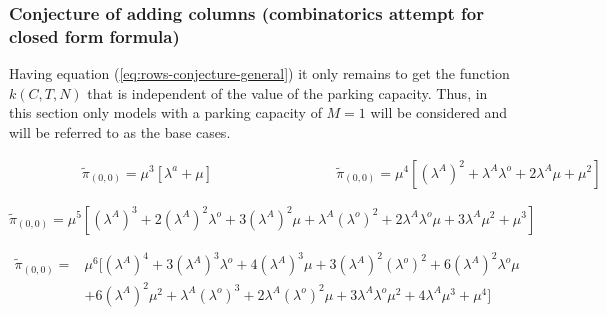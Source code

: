 \subsubsection{Conjecture of adding columns (combinatorics attempt for closed form formula)}
Having equation (\ref{eq:rows-conjecture-general}) it only remains to get the function \(k(C,T,N)\) that is independent of the value of the parking capacity. 
Thus, in this section only models with a parking capacity of \(M=1\) will be considered and will be referred to as the base cases. 

\begin{multicols}{2}
    \begin{figure}[H]
        \centering
        \scalebox{0.9}{}
    \end{figure}
    \columnbreak
    \begin{figure}[H]
        \centering
        \scalebox{0.9}{}
    \end{figure}
\end{multicols}
\vspace{-0.5cm}
\begin{alignat}{2} \label{eq:00_rate_1131}
    \hspace{4em} & \tilde{\pi}_{(0,0)} = \mu^3[\lambda^a + \mu] \hspace{8em} & \tilde{\pi}_{(0,0)} = \mu^4[(\lambda^A)^2 + \lambda^A \lambda^o + 2\lambda^A \mu + \mu^2] 
\end{alignat}


\begin{figure}[h]
    \centering
    \scalebox{0.8}{}
\end{figure}
\begin{equation}\label{eq:00_rate_1141}
    \tilde{\pi}_{(0,0)} = \mu^5[(\lambda^A)^3 + 2(\lambda^A)^2 \lambda^o + 3(\lambda^A)^2 \mu + \lambda^A (\lambda^o)^2 + 2\lambda^A \lambda^o \mu + 3\lambda^A \mu^2 + \mu^3]
\end{equation}

\begin{figure}[h]
    \centering
    \scalebox{0.8}{}
\end{figure}
\begin{align}\label{eq:00_rate_1151}
    \tilde{\pi}_{(0,0)} =& \mu^6[(\lambda^A)^4 + 3(\lambda^A)^3 \lambda^o + 4(\lambda^A)^3 \mu + 3(\lambda^A)^2 (\lambda^o)^2 + 6(\lambda^A)^2 \lambda^o \mu \\
    & + 6(\lambda^A)^2 \mu^2 + \lambda^A (\lambda^o)^3 + 2\lambda^A (\lambda^o)^2 \mu + 3\lambda^A \lambda^o \mu^2 + 4\lambda^A \mu^3 + \mu^4] \nonumber
\end{align}

